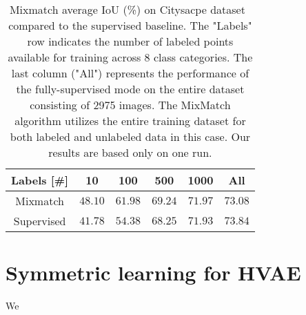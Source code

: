 \begin{table}[tbh]
    \begin{tabular}{|c|c|c|c|c|c|}
    \hline
    Labels [\#]  & 10 & 100 & 500 & 1000 & All \\
    \hline
    Mixmatch & $48.10$ & $61.98$ & $69.24$ & $71.97$ & $73.08$ \\
    \hline
    Supervised & $41.78$ & $54.38$ & $68.25$ & $71.93$ & $73.84$ \\
    \hline
    \end{tabular}
    \caption[Mixmatch average IoU on CityScape]{Mixmatch average IoU (\%) on Citysacpe dataset~\cite{cityscapes-2016} compared to the supervised baseline. The 
    "Labels" row indicates the number of labeled points available for training across 8 class categories. The last 
    column ("All") represents the performance of the fully-supervised mode on the entire dataset consisting of 2975 images. 
    The MixMatch algorithm utilizes the entire training dataset for both labeled and unlabeled data in this case.
    Our results are based only on one run.}
    \label{tab:mixmatch-cityscapes-iou}
\end{table}
     

\section{Symmetric learning for HVAE}
We
